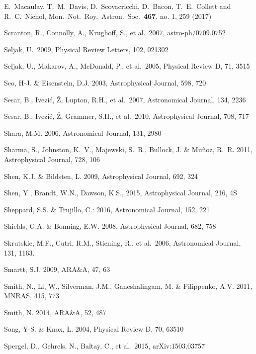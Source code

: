 \documentclass[twocolumn]{aastex61}
\begin{document}
\begin{thebibliography}{}
\bibitem[()]{}  E.~Macaulay, T.~M.~Davis, D.~Scovacricchi, D.~Bacon, T.~E.~Collett and R.~C.~Nichol, Mon.\ Not.\ Roy.\ Astron.\ Soc.\  {\bf 467}, no. 1, 259 (2017)

\bibitem[()]{} Scranton, R., Connolly, A., Krughoff, S., et al.~2007, astro-ph/0709.0752

\bibitem[()]{} Seljak, U.\ 2009, Physical Review Letters, 102, 021302

\bibitem[()]{} Seljak, U., Makarov, A., McDonald, P., et al.~2005,  Physical Review D, 71, 3515

\bibitem[()]{} Seo, H-J. \& Eisenstein, D.J. 2003, Astrophysical Journal, 598, 720

\bibitem[()]{} Sesar, B., Ivezi\'{c}, \v{Z}, Lupton, R.H., et al.~2007, Astronomical Journal, 134, 2236

\bibitem[()]{} Sesar, B., Ivezi\'{c}, \v{Z}, Grammer, S.H., et al.~2010, Astrophysical Journal, 708, 717

\bibitem[()]{} Shara, M.M. 2006, Astronomical Journal, 131, 2980

\bibitem[()]{} Sharma, S., Johnston, K.~V., Majewski, S.~R., Bullock, J. \& Mu{\~n}oz, R.~R. 2011,
                      Astrophysical Journal, 728, 106

\bibitem[()]{} Shen, K.J. \& Bildsten, L. 2009, Astrophysical Journal, 692, 324

\bibitem[()]{} Shen, Y., Brandt, W.N., Dawson, K.S., 2015, Astrophysical Journal, 216, 4S

\bibitem[()]{}  Sheppard, S.S.  \&  Trujillo, C.: 2016, Astronomical Journal, 152, 221

\bibitem[()]{} Shields, G.A. \& Bonning, E.W. 2008, Astrophysical Journal, 682, 758

 Skrutskie, M.F., Cutri, R.M., Stiening, R., et al.~2006, Astronomical Journal, 131, 1163.

\bibitem[()]{} Smartt, S.J. 2009, ARA\&A, 47, 63

\bibitem[()]{} Smith, N., Li, W., Silverman, J.M., Ganeshalingam, M. \& Filippenko, A.V. 2011, MNRAS, 415, 773

\bibitem[()]{} Smith, N. 2014, ARA\&A, 52, 487

\bibitem[()]{} Song, Y-S. \& Knox, L. 2004, Physical Review D, 70, 63510

\bibitem[()]{} Spergel, D., Gehrels, N., Baltay, C., et al.~2015, arXiv:1503.03757



\end{thebibliography}
\end{document}
